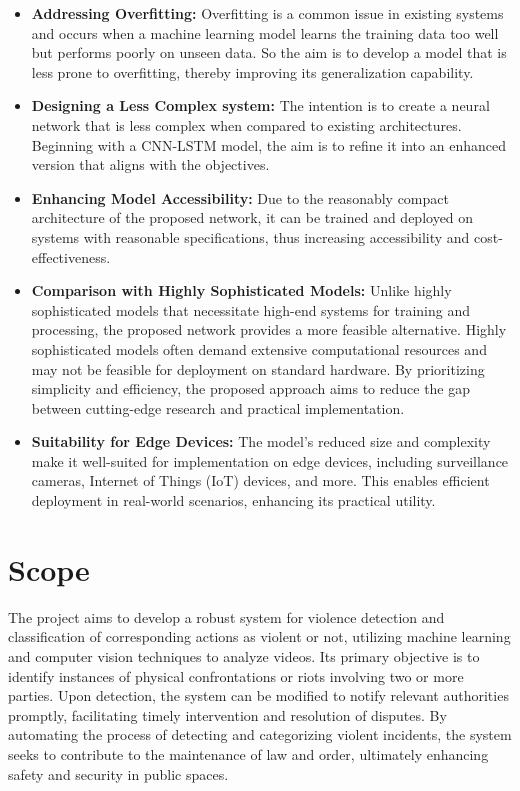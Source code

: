 \begin{itemize}
    \item \textbf{Addressing Overfitting:} Overfitting is a common issue in existing systems and occurs when a machine learning model learns the training data too well but performs poorly on unseen data. So the aim is to develop a model that is less prone to overfitting, thereby improving its generalization capability\cite{overfit}.

    \item \textbf{Designing a Less Complex system:} The intention is to create a neural network that is less complex when compared to existing architectures. Beginning with a CNN-LSTM model, the aim is to refine it into an enhanced version that aligns with the objectives.

    \item \textbf{Enhancing Model Accessibility:} Due to the reasonably compact architecture of the proposed network, it can be trained and deployed on systems with reasonable specifications, thus increasing accessibility and cost-effectiveness.

    \item \textbf{Comparison with Highly Sophisticated Models:} Unlike highly sophisticated models that necessitate high-end systems for training and processing, the proposed network provides a more feasible alternative. Highly sophisticated models often demand extensive computational resources and may not be feasible for deployment on standard hardware. By prioritizing simplicity and efficiency, the proposed approach aims to reduce the gap between cutting-edge research and practical implementation.

    \item \textbf{Suitability for Edge Devices:} The model's reduced size and complexity make it well-suited for implementation on edge devices, including surveillance cameras, Internet of Things (IoT) devices, and more\cite{edge_ai}. This enables efficient deployment in real-world scenarios, enhancing its practical utility.
\end{itemize}

\clearpage

\section*{Scope}


\noindent The project aims to develop a robust system for violence detection and classification of corresponding actions as violent or not, utilizing machine learning and computer vision techniques to analyze videos. Its primary objective is to identify instances of physical confrontations or riots involving two or more parties. Upon detection, the system can be modified to notify relevant authorities promptly, facilitating timely intervention and resolution of disputes. By automating the process of detecting and categorizing violent incidents, the system seeks to contribute to the maintenance of law and order, ultimately enhancing safety and security in public spaces\cite{in_out_violence_ai}.


